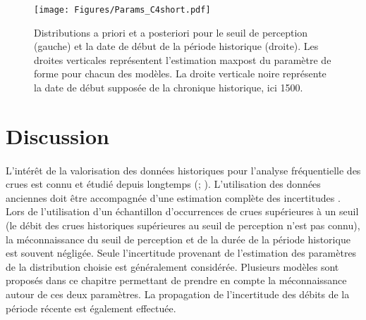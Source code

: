 \documentclass[11pt]{article}
\begin{document}
	\begin{figure}[h]
		\centering
		\texttt{[image: Figures/Params\_C4short.pdf]}	
		\caption{Distributions a priori et a posteriori pour le seuil de perception (gauche) et la date de début de la période historique (droite). Les droites verticales représentent l'estimation maxpost du paramètre de forme pour chacun des modèles. La droite verticale noire représente la date de début supposée de la chronique historique, ici 1500.}
		\label{fig:Params_C4short}
	\end{figure}
	
	\FloatBarrier
	
	\section{Discussion}
	\label{sec:Discussion}
	\paragraph{} L'intérêt de la valorisation des données historiques pour l'analyse fréquentielle des crues est connu et étudié depuis longtemps (\cite{benson_use_1950}; \cite{stedinger_flood_1986}). L'utilisation des données anciennes doit être accompagnée d'une estimation complète des incertitudes \citep{kjeldsen_documentary_2014}. Lors de l'utilisation d'un échantillon d'occurrences de crues supérieures à un seuil (le débit des crues historiques supérieures au seuil de perception n'est pas connu), la méconnaissance du seuil de perception et de la durée de la période historique est souvent négligée. Seule l'incertitude provenant de l'estimation des paramètres de la distribution choisie est généralement considérée. Plusieurs modèles sont proposés dans ce chapitre permettant de prendre en compte la méconnaissance autour de ces deux paramètres. La propagation de l'incertitude des débits de la période récente est également effectuée. 
	
\end{document}
